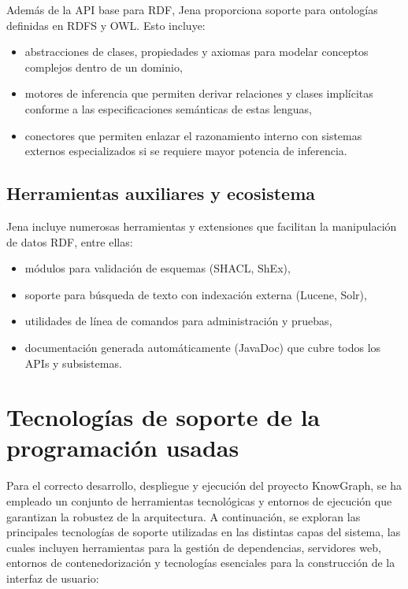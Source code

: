 \documentclass{article}
\begin{document}
Además de la API base para RDF, Jena proporciona soporte para ontologías definidas en RDFS y OWL. Esto incluye:

\begin{itemize}
    \item abstracciones de clases, propiedades y axiomas para modelar conceptos complejos dentro de un dominio,
    \item motores de inferencia que permiten derivar relaciones y clases implícitas conforme a las especificaciones semánticas de estas lenguas,
    \item conectores que permiten enlazar el razonamiento interno con sistemas externos especializados si se requiere mayor potencia de inferencia. 
\end{itemize}

\subsection{Herramientas auxiliares y ecosistema}

Jena incluye numerosas herramientas y extensiones que facilitan la manipulación de datos RDF, entre ellas:

\begin{itemize}
    \item módulos para validación de esquemas (SHACL, ShEx),
    \item soporte para búsqueda de texto con indexación externa (Lucene, Solr),
    \item utilidades de línea de comandos para administración y pruebas,
    \item documentación generada automáticamente (JavaDoc) que cubre todos los APIs y subsistemas. 
\end{itemize}

\section{Tecnologías de soporte de la programación usadas}

Para el correcto desarrollo, despliegue y ejecución del proyecto KnowGraph, se ha empleado un conjunto de herramientas tecnológicas y entornos de ejecución que garantizan la robustez de la arquitectura. A continuación, se exploran las principales tecnologías de soporte utilizadas en las distintas capas del sistema, las cuales incluyen herramientas para la gestión de dependencias, servidores web, entornos de contenedorización y tecnologías esenciales para la construcción de la interfaz de usuario:
\end{document}
